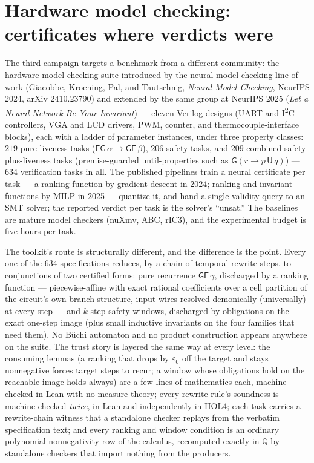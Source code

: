 \section{Hardware model checking: certificates where verdicts were}
\label{sec:exp-circuits}

The third campaign targets a benchmark from a different community: the
hardware model-checking suite introduced by the neural model-checking
line of work (Giacobbe, Kroening, Pal, and Tautschnig, \emph{Neural
Model Checking}, NeurIPS 2024, arXiv 2410.23790) and extended by the
same group at NeurIPS 2025 (\emph{Let a Neural Network Be Your
Invariant}) --- eleven Verilog designs (UART and I\textsuperscript{2}C
controllers, VGA and LCD drivers, PWM, counter, and
thermocouple-interface blocks), each with a ladder of parameter
instances, under three
property classes: $219$ pure-liveness tasks
($\mathsf{FG}\,\alpha \to \mathsf{GF}\,\beta$), $206$ safety tasks, and
$209$ combined safety-plus-liveness tasks (premise-guarded
until-properties such as $\mathsf{G}(r \to p\,\mathsf{U}\,q)$) ---
$634$ verification tasks in all. The published pipelines train a
neural certificate per task --- a ranking function by gradient descent
in 2024; ranking and invariant functions by MILP in 2025 --- quantize
it, and hand a single validity query to an SMT solver; the reported
verdict per task is the solver's ``unsat.'' The baselines are mature
model checkers (nuXmv, ABC, rIC3), and the experimental budget is five
hours per task.

The toolkit's route is structurally different, and the difference is
the point. Every one of the $634$ specifications reduces, by a chain
of temporal rewrite steps, to conjunctions of two certified forms:
pure recurrence $\mathsf{GF}\,\gamma$, discharged by a ranking
function --- piecewise-affine with exact rational coefficients over a
cell partition of the circuit's own branch structure, input wires
resolved demonically (universally) at every step --- and $k$-step
safety windows, discharged by obligations on the exact one-step image
(plus small inductive invariants on the four families that need
them). No
B\"uchi automaton and no product construction appears anywhere on the
suite. The trust story is layered the same way at every level: the
consuming lemmas (a ranking that drops by $\varepsilon_0$ off the
target and stays nonnegative forces target steps to recur; a window
whose obligations hold on the reachable image holds always) are a few
lines of mathematics each, machine-checked in Lean with no measure
theory; every rewrite rule's soundness is machine-checked \emph{twice},
in Lean and independently in HOL4; each task carries a rewrite-chain
witness that a standalone checker replays from the verbatim
specification text; and every ranking and window condition is an
ordinary polynomial-nonnegativity row of the
 calculus, recomputed exactly in
$\mathbb{Q}$ by standalone checkers that import nothing from the
producers.

